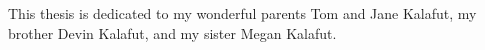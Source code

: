 This thesis is dedicated to my wonderful parents Tom and Jane Kalafut, my brother Devin Kalafut, and my sister Megan Kalafut.

